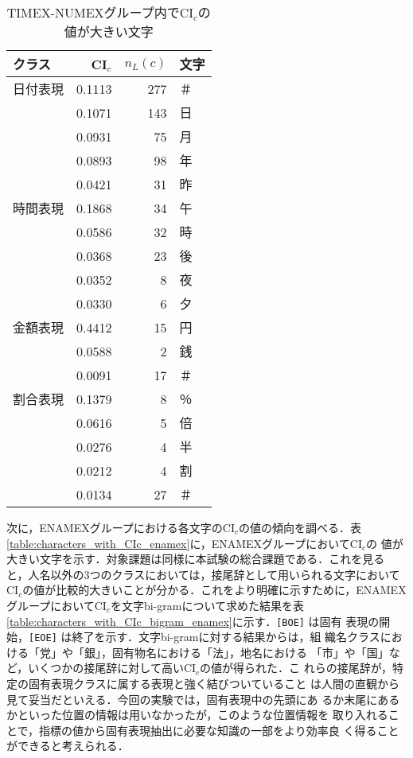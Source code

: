 \begin{table}[tb]\small
\caption{\label{table:characters_with_CIc_numex}TIMEX-NUMEXグループ内でCI$_c$の値が大きい文字}
\begin{center}
\begin{tabular}{|l||r|r|l|} \hline
クラス   & CI$_c$ & \(n_L(c)\) & 文字 \\ \hline \hline
日付表現 & 0.1113 &   277 & ＃ \\ \cline{2-4}
         & 0.1071 &   143 & 日 \\ \cline{2-4}
         & 0.0931 &    75 & 月 \\ \cline{2-4}
         & 0.0893 &    98 & 年 \\ \cline{2-4}
         & 0.0421 &    31 & 昨 \\ \hline \hline
時間表現 & 0.1868 &    34 & 午 \\ \cline{2-4}
         & 0.0586 &    32 & 時 \\ \cline{2-4}
         & 0.0368 &    23 & 後 \\ \cline{2-4}
         & 0.0352 &     8 & 夜 \\ \cline{2-4}
         & 0.0330 &     6 & 夕 \\ \hline \hline
金額表現 & 0.4412 &    15 & 円 \\ \cline{2-4}
         & 0.0588 &     2 & 銭 \\ \cline{2-4}
         & 0.0091 &    17 & ＃ \\ \hline \hline
割合表現 & 0.1379 &     8 & ％ \\ \cline{2-4}
         & 0.0616 &     5 & 倍 \\ \cline{2-4}
         & 0.0276 &     4 & 半 \\ \cline{2-4}
         & 0.0212 &     4 & 割 \\ \cline{2-4}
         & 0.0134 &    27 & ＃ \\ \hline
\end{tabular}
\end{center}
\end{table}



次に，ENAMEXグループにおける各文字のCI$_c$の値の傾向を調べる．表
\ref{table:characters_with_CIc_enamex}に，ENAMEXグループにおいてCI$_c$の
値が大きい文字を示す．対象課題は同様に本試験の総合課題である．これを見る
と，人名以外の3つのクラスにおいては，接尾辞として用いられる文字において
CI$_c$の値が比較的大きいことが分かる．これをより明確に示すために，ENAMEX
グループにおいてCI$_c$を文字bi-gramについて求めた結果を表
\ref{table:characters_with_CIc_bigram_enamex}に示す．{\tt [BOE]} は固有
表現の開始，{\tt [EOE]} は終了を示す．文字bi-gramに対する結果からは，組
織名クラスにおける「党」や「銀」，固有物名における「法」，地名における
「市」や「国」など，いくつかの接尾辞に対して高いCI$_c$の値が得られた．こ
れらの接尾辞が，特定の固有表現クラスに属する表現と強く結びついていること
は人間の直観から見て妥当だといえる．今回の実験では，固有表現中の先頭にあ
るか末尾にあるかといった位置の情報は用いなかったが，このような位置情報を
取り入れることで，指標の値から固有表現抽出に必要な知識の一部をより効率良
く得ることができると考えられる．


